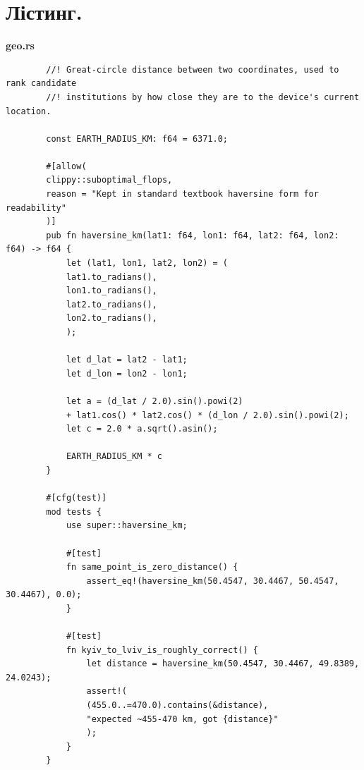 \documentclass[14pt, a4paper]{extreport}
\begin{document}
	\pagebreak

	\section*{Лістинг.}

	\textbf{geo.rs}

	\begin{verbatim}
		//! Great-circle distance between two coordinates, used to rank candidate
		//! institutions by how close they are to the device's current location.
		
		const EARTH_RADIUS_KM: f64 = 6371.0;
		
		#[allow(
		clippy::suboptimal_flops,
		reason = "Kept in standard textbook haversine form for readability"
		)]
		pub fn haversine_km(lat1: f64, lon1: f64, lat2: f64, lon2: f64) -> f64 {
			let (lat1, lon1, lat2, lon2) = (
			lat1.to_radians(),
			lon1.to_radians(),
			lat2.to_radians(),
			lon2.to_radians(),
			);
			
			let d_lat = lat2 - lat1;
			let d_lon = lon2 - lon1;
			
			let a = (d_lat / 2.0).sin().powi(2)
			+ lat1.cos() * lat2.cos() * (d_lon / 2.0).sin().powi(2);
			let c = 2.0 * a.sqrt().asin();
			
			EARTH_RADIUS_KM * c
		}
		
		#[cfg(test)]
		mod tests {
			use super::haversine_km;
			
			#[test]
			fn same_point_is_zero_distance() {
				assert_eq!(haversine_km(50.4547, 30.4467, 50.4547, 30.4467), 0.0);
			}
			
			#[test]
			fn kyiv_to_lviv_is_roughly_correct() {
				let distance = haversine_km(50.4547, 30.4467, 49.8389, 24.0243);
				assert!(
				(455.0..=470.0).contains(&distance),
				"expected ~455-470 km, got {distance}"
				);
			}
		}
	\end{verbatim}
\end{document}
